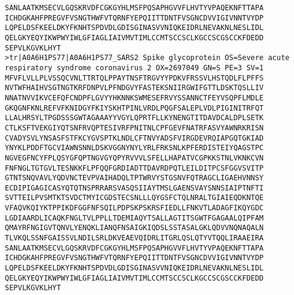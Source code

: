 \begin{lstlisting}
SANLAATKMSECVLGQSKRVDFCGKGYHLMSFPQSAPHGVVFLHVTYVPAQEKNFTTAPA
ICHDGKAHFPREGVFVSNGTHWFVTQRNFYEPQIITTDNTFVSGNCDVVIGIVNNTVYDP
LQPELDSFKEELDKYFKNHTSPDVDLGDISGINASVVNIQKEIDRLNEVAKNLNESLIDL
QELGKYEQYIKWPWYIWLGFIAGLIAIVMVTIMLCCMTSCCSCLKGCCSCGSCCKFDEDD
SEPVLKGVKLHYT
>tr|A0A6H1PS77|A0A6H1PS77_SARS2 Spike glycoprotein OS=Severe acute respiratory syndrome coronavirus 2 OX=2697049 GN=S PE=3 SV=1
MFVFLVLLPLVSSQCVNLTTRTQLPPAYTNSFTRGVYYPDKVFRSSVLHSTQDLFLPFFS
NVTWFHAIHVSGTNGTKRFDNPVLPFNDGVYFASTEKSNIIRGWIFGTTLDSKTQSLLIV
NNATNVVIKVCEFQFCNDPFLGVYYHKNNKSWMESEFRVYSSANNCTFEYVSQPFLMDLE
GKQGNFKNLREFVFKNIDGYFKIYSKHTPINLVRDLPQGFSALEPLVDLPIGINITRFQT
LLALHRSYLTPGDSSSGWTAGAAAYYVGYLQPRTFLLKYNENGTITDAVDCALDPLSETK
CTLKSFTVEKGIYQTSNFRVQPTESIVRFPNITNLCPFGEVFNATRFASVYAWNRKRISN
CVADYSVLYNSASFSTFKCYGVSPTKLNDLCFTNVYADSFVIRGDEVRQIAPGQTGKIAD
YNYKLPDDFTGCVIAWNSNNLDSKVGGNYNYLYRLFRKSNLKPFERDISTEIYQAGSTPC
NGVEGFNCYFPLQSYGFQPTNGVGYQPYRVVVLSFELLHAPATVCGPKKSTNLVKNKCVN
FNFNGLTGTGVLTESNKKFLPFQQFGRDIADTTDAVRDPQTLEILDITPCSFGGVSVITP
GTNTSNQVAVLYQDVNCTEVPVAIHADQLTPTWRVYSTGSNVFQTRAGCLIGAEHVNNSY
ECDIPIGAGICASYQTQTNSPRRARSVASQSIIAYTMSLGAENSVAYSNNSIAIPTNFTI
SVTTEILPVSMTKTSVDCTMYICGDSTECSNLLLQYGSFCTQLNRALTGIAIEQDKNTQE
VFAQVKQIYKTPPIKDFGGFNFSQILPDPSKPSKRSFIEDLLFNKVTLADAGFIKQYGDC
LGDIAARDLICAQKFNGLTVLPPLLTDEMIAQYTSALLAGTITSGWTFGAGAALQIPFAM
QMAYRFNGIGVTQNVLYENQKLIANQFNSAIGKIQDSLSSTASALGKLQDVVNQNAQALN
TLVKQLSSNFGAISSVLNDILSRLDKVEAEVQIDRLITGRLQSLQTYVTQQLIRAAEIRA
SANLAATKMSECVLGQSKRVDFCGKGYHLMSFPQSAPHGVVFLHVTYVPAQEKNFTTAPA
ICHDGKAHFPREGVFVSNGTHWFVTQRNFYEPQIITTDNTFVSGNCDVVIGIVNNTVYDP
LQPELDSFKEELDKYFKNHTSPDVDLGDISGINASVVNIQKEIDRLNEVAKNLNESLIDL
QELGKYEQYIKWPWYIWLGFIAGLIAIVMVTIMLCCMTSCCSCLKGCCSCGSCCKFDEDD
SEPVLKGVKLHYT
\end{lstlisting}